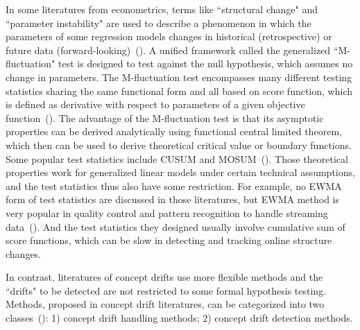 \documentclass[twoside,11pt]{article}
\begin{document}
In some literatures from econometrics, terms like ``structural change" and ``parameter instability" are used to describe a phenomenon in which the parameters of some regression models changes in historical (retrospective) or future data (forward-looking)~(\cite{zeileis2005unified}). A unified framework called the generalized ``M-fluctuation" test is designed to test against the null hypothesis, which assumes no change in parameters. The M-fluctuation test encompasses many different testing statistics sharing the same functional form and all based on score function, which is defined as derivative with respect to parameters of a given objective function~(\cite{zeileis2007generalized}). The advantage of the M-fluctuation test is that its asymptotic properties can be derived analytically using functional central limited theorem, which then can be used to derive theoretical critical value or boundary functions. Some popular test statistics  include CUSUM and MOSUM~(\cite{xia2009monitoring}). Those theoretical properties work for generalized linear models under certain technical assumptions, and the test statistics thus also have some restriction. For example, no EWMA form of test statistics are discussed in those literatures, but EWMA method  is very popular in quality control and pattern recognition to handle streaming data~(\cite{ross2012exponentially}). And the test statistics they designed usually involve cumulative sum of score functions, which can be slow in detecting and tracking online structure changes.  

In contrast, literatures of concept drifts use more flexible methods and the ``drifts" to be detected are not restricted to some formal hypothesis testing. Methods, proposed in concept drift literatures, can be categorized into two classes~(\cite{tsymbal2004problem}): 1) concept drift handling methods; 2) concept drift detection methods. 
\end{document}
